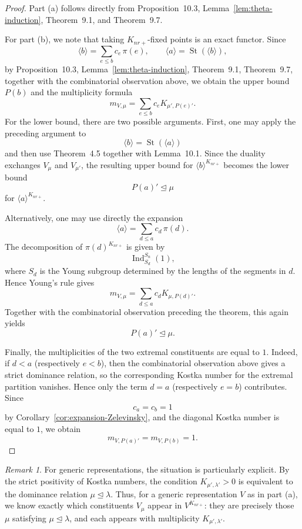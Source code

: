 \documentclass[12pt]{article}
\theoremstyle{remark}
\newtheorem{remark}[theorem]{Remark}
\begin{document}
\begin{proof}
Part (a) follows directly from Proposition~10.3, Lemma~\ref{lem:theta-induction},
Theorem~9.1, and Theorem~9.7.

For part (b), we note that taking $K_{nr+}$-fixed points is an
exact functor. Since
$$
\langle b\rangle=\sum_{e\leq b}c_e\,\pi(e),
\qquad
\langle a\rangle=\operatorname{St}(\langle b\rangle),
$$
by Proposition~10.3, Lemma~\ref{lem:theta-induction}, Theorem~9.1, Theorem~9.7,
together with the combinatorial observation above, we obtain the
upper bound $P(b)$ and the multiplicity formula
$$
m_{V,\mu}
=
\sum_{e\leq b}c_eK_{\mu',P(e)'}.
$$
For the lower bound, there are two possible arguments. First, one
may apply the preceding argument to
$$
\langle b\rangle=\operatorname{St}(\langle a\rangle)
$$
and then use Theorem~4.5 together with Lemma~10.1. Since the
duality exchanges $V_\mu$ and $V_{\mu'}$, the resulting upper
bound for $\langle b\rangle^{K_{nr+}}$ becomes the lower bound
$$
P(a)'\unlhd\mu
$$
for $\langle a\rangle^{K_{nr+}}$.

Alternatively, one may use directly the expansion
$$
\langle a\rangle=\sum_{d\leq a}c_d\,\pi(d).
$$
The decomposition of $\pi(d)^{K_{nr+}}$ is given by
$$
\operatorname{Ind}_{S_d}^{S_n}(1),
$$
where $S_d$ is the Young subgroup determined by the lengths of
the segments in $d$. Hence Young's rule gives
$$
m_{V,\mu}
=
\sum_{d\leq a}c_dK_{\mu,P(d)'}.
$$
Together with the combinatorial observation preceding the theorem,
this again yields
$$
P(a)'\unlhd\mu.
$$


Finally, the multiplicities of the two extremal constituents are
equal to $1$. Indeed, if $d<a$ (respectively $e<b$), then the
combinatorial observation above gives a strict dominance relation,
so the corresponding Kostka number for the extremal partition
vanishes. Hence only the term $d=a$ (respectively $e=b$)
contributes. Since
$$
c_a=c_b=1
$$
by Corollary~\ref{cor:expansion-Zelevinsky}, and the diagonal
Kostka number is equal to $1$, we obtain
$$
m_{V,P(a)'}=m_{V,P(b)}=1.
$$
\end{proof}

\begin{remark}
For generic representations, the situation is particularly explicit. By the strict positivity of Kostka numbers, the condition $K_{\mu',\lambda'} > 0$ is equivalent to the dominance relation $\mu \unlhd \lambda$. Thus, for a generic representation $V$ as in part (a), we know exactly which constituents $V_\mu$ appear in $V^{K_{nr+}}$: they are precisely those $\mu$ satisfying $\mu \unlhd \lambda$, and each appears with multiplicity $K_{\mu',\lambda'}$.
\end{remark}
\end{document}
